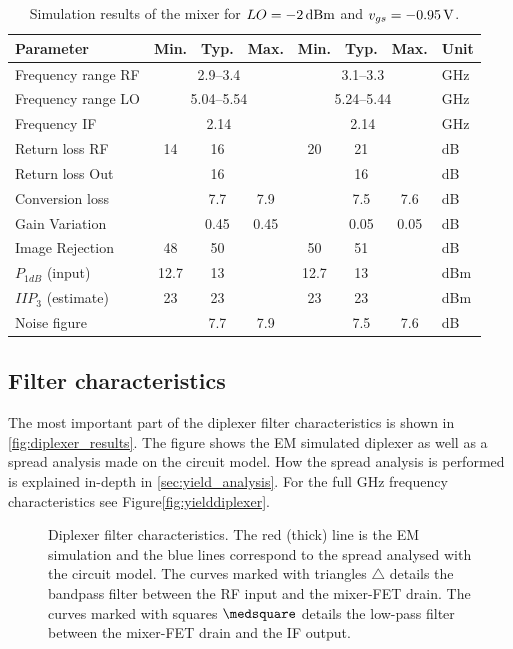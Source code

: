 			\begin{table}[hbt!]
				\caption[Simulation result of the mixer.]{Simulation results of the mixer for $LO=\unit[-2]{dBm}$ and $v_{gs}=\unit[-0.95]{V}$.\disclaimer}
				\label{tab:resultmixer}
				\centering
				\begin{tabular}{ l c c c c c c l } \toprule
					Parameter & Min. & Typ. & Max. & Min. & Typ. & Max. & Unit \\\midrule
					Frequency range RF & \multicolumn{3}{c}{2.9--3.4} & \multicolumn{3}{c}{3.1--3.3} & GHz \\
					Frequency range LO & \multicolumn{3}{c}{5.04--5.54} & \multicolumn{3}{c}{5.24--5.44} & GHz \\
					Frequency IF & \multicolumn{3}{c}{2.14} & \multicolumn{3}{c}{2.14} & GHz \\
					Return loss RF & 14 & 16 &  & 20 & 21 &  & dB \\
					Return loss Out & & 16 & & & 16 & & dB \\
					Conversion loss &  & 7.7 & 7.9 &  & 7.5 & 7.6 & dB \\
					Gain Variation & & 0.45 & 0.45 & & 0.05 & 0.05 & dB \\
					Image Rejection & 48 & 50 &  & 50 & 51 &  &  dB \\
					$P_{1dB}$ (input) & 12.7 & 13 &  & 12.7 & 13 &  & dBm \\
					$IIP_3$ (estimate) & 23 & 23 &  & 23 & 23 &  & dBm \\
					Noise figure &  & 7.7 & 7.9 &  & 7.5 & 7.6 & dB \\\bottomrule
				\end{tabular}
			\end{table}

		\subsection{Filter characteristics}
			The most important part of the diplexer filter characteristics is shown in \autoref{fig:diplexer_results}. The figure shows the EM simulated diplexer as well as a spread analysis made on the circuit model. How the spread analysis is performed is explained in-depth in \autoref{sec:yield_analysis}. For the full \unit[0--10]{GHz} frequency characteristics see Figure\autoref{fig:yielddiplexer}.

			\begin{figure}[hbt!]
				\centering
				\caption[Diplexer filter characteristics.]{Diplexer filter characteristics. The red (thick) line is the EM simulation and the blue lines correspond to the spread analysed with the circuit model. The curves marked with triangles $\triangle$ details the bandpass filter between the RF input and the mixer-FET drain. The curves marked with squares $\medsquare$ details the low-pass filter between the mixer-FET drain and the IF output.}\label{fig:diplexer_results}
			\end{figure}

